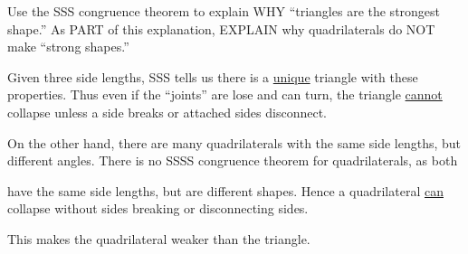 \documentclass[noauthor,nooutcomes]{ximera}
\begin{document}
\begin{question}
  Use the SSS congruence theorem to explain WHY ``triangles are the
  strongest shape.''  As PART of this explanation, EXPLAIN why
  quadrilaterals do NOT make ``strong shapes.''
  \begin{freeResponse}
    Given three side lengths, SSS tells us there is a
    \underline{unique} triangle with these properties. Thus even if
    the ``joints'' are lose and can turn, the triangle
    \underline{cannot} collapse unless a side breaks or attached
    sides disconnect.

    
    On the other hand, there are many quadrilaterals with the same
    side lengths, but different angles. There is no SSSS congruence
    theorem for quadrilaterals, as both

    \begin{center}
    \end{center}
    have the same side lengths, but are different shapes. Hence a
    quadrilateral \underline{can} collapse without sides breaking or
    disconnecting sides.

    This makes the quadrilateral weaker than the triangle.
  \end{freeResponse}
\end{question}
\end{document}
